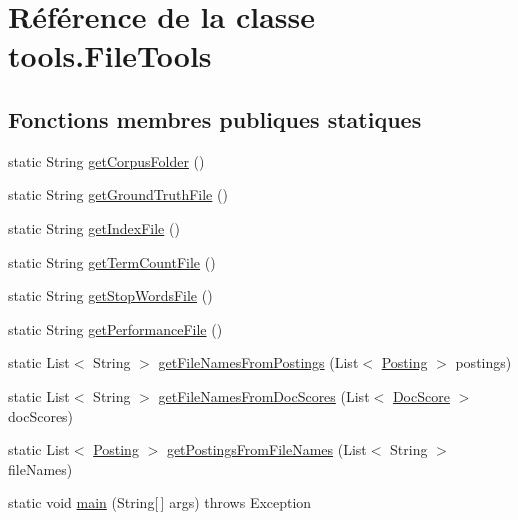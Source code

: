 \hypertarget{classtools_1_1FileTools}{}\section{Référence de la classe tools.\+File\+Tools}
\label{classtools_1_1FileTools}
\subsection*{Fonctions membres publiques statiques}
\begin{DoxyCompactItemize}
\item 
static String \hyperlink{classtools_1_1FileTools_a7858c30aa9831f703fe073b1f0ec2a4d}{get\+Corpus\+Folder} ()
\item 
static String \hyperlink{classtools_1_1FileTools_ab0cdb1cc0faef239c785d61607959b2c}{get\+Ground\+Truth\+File} ()
\item 
static String \hyperlink{classtools_1_1FileTools_a20238076992e33ac38b17cb439def559}{get\+Index\+File} ()
\item 
static String \hyperlink{classtools_1_1FileTools_a988c52caadc199f691faef3a30fd6dda}{get\+Term\+Count\+File} ()
\item 
static String \hyperlink{classtools_1_1FileTools_a31f4a714b7f3290c892e41fc8aa0004f}{get\+Stop\+Words\+File} ()
\item 
static String \hyperlink{classtools_1_1FileTools_a967fdb1dad8e97ddc7f9a709e6ad0493}{get\+Performance\+File} ()
\item 
static List$<$ String $>$ \hyperlink{classtools_1_1FileTools_a162f195efa760e0c0edcce9edf5053e3}{get\+File\+Names\+From\+Postings} (List$<$ \hyperlink{classindexation_1_1content_1_1Posting}{Posting} $>$ postings)
\item 
static List$<$ String $>$ \hyperlink{classtools_1_1FileTools_ad9fd6276d74325a0f76909a7e8e98c08}{get\+File\+Names\+From\+Doc\+Scores} (List$<$ \hyperlink{classquery_1_1DocScore}{Doc\+Score} $>$ doc\+Scores)
\item 
static List$<$ \hyperlink{classindexation_1_1content_1_1Posting}{Posting} $>$ \hyperlink{classtools_1_1FileTools_aaecce00a830429064064ad2e67fb9c6e}{get\+Postings\+From\+File\+Names} (List$<$ String $>$ file\+Names)
\item 
static void \hyperlink{classtools_1_1FileTools_a4ca7adceaf54c47b855151d240150961}{main} (String\mbox{[}$\,$\mbox{]} args)  throws Exception  	
\end{DoxyCompactItemize}


